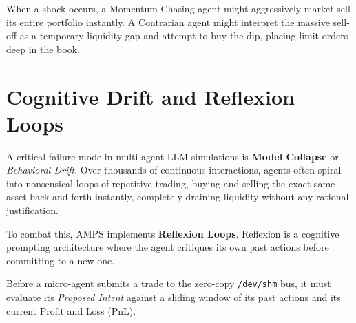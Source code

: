 When a shock occurs, a Momentum-Chasing agent might aggressively market-sell its entire portfolio instantly. A Contrarian agent might interpret the massive sell-off as a temporary liquidity gap and attempt to buy the dip, placing limit orders deep in the book.

\section{Cognitive Drift and Reflexion Loops}

A critical failure mode in multi-agent LLM simulations is \textbf{Model Collapse} or \textit{Behavioral Drift}. Over thousands of continuous interactions, agents often spiral into nonsensical loops of repetitive trading, buying and selling the exact same asset back and forth instantly, completely draining liquidity without any rational justification.

To combat this, AMPS implements \textbf{Reflexion Loops}. Reflexion is a cognitive prompting architecture where the agent critiques its own past actions before committing to a new one.

Before a micro-agent submits a trade to the zero-copy \texttt{/dev/shm} bus, it must evaluate its \textit{Proposed Intent} against a sliding window of its past actions and its current Profit and Loss (PnL). 

